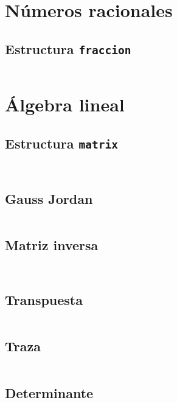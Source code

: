 \documentclass[11pt]{article}
\begin{document}
	\newpage
	\section{Números racionales}
		\subsection{Estructura \texttt{fraccion}}
		\inputminted[tabsize=2,breaklines,firstline=7,lastline=123,fontsize=\small]{c++}{fraccion.cpp}
		
	\newpage
	\section{Álgebra lineal}
		\subsection{Estructura \texttt{matrix}}
		\inputminted[tabsize=2,breaklines,firstline=9,lastline=33,fontsize=\small]{c++}{matrix.cpp}
		\inputminted[tabsize=2,breaklines,firstline=122,lastline=227,fontsize=\small]{c++}{matrix.cpp}
		
		\subsection{Gauss Jordan}
		\inputminted[tabsize=2,breaklines,firstline=35,lastline=73,fontsize=\small]{c++}{matrix.cpp}
		
		\subsection{Matriz inversa}
		\inputminted[tabsize=2,breaklines,firstline=80,lastline=86,fontsize=\small]{c++}{matrix.cpp}
		\inputminted[tabsize=2,breaklines,firstline=260,lastline=281,fontsize=\small]{c++}{matrix.cpp}
		
		\subsection{Transpuesta}
		\inputminted[tabsize=2,breaklines,firstline=250,lastline=258,fontsize=\small]{c++}{matrix.cpp}
		
		\subsection{Traza}
		\inputminted[tabsize=2,breaklines,firstline=283,lastline=289,fontsize=\small]{c++}{matrix.cpp}
		
		\subsection{Determinante}
		\inputminted[tabsize=2,breaklines,firstline=291,lastline=307,fontsize=\small]{c++}{matrix.cpp}
		
\end{document}
